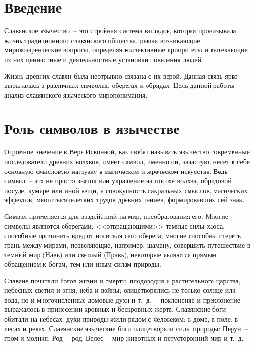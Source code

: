 \documentclass[pscyr,titlepage,chapters]{hedreport}
\begin{document}
  \maketitle
  \onehalfspacing
  \tableofcontents

  \chapter*{Введение}

  Славянское язычество~-- это стройная система взглядов, которая пронизывала
  жизнь традиционного славянского общества, решая возникающие мировоззренческие
  вопросы, определяя коллективные приоритеты и вытекающие из них ценностные и
  деятельностные установки поведения людей.

  Жизнь древних славян была неотрывно связана с их верой. Данная связь ярко
  выражалась в различных символах, оберегах и обрядах.  Цель данной работы~--
  анализ славянского языческого миропонимания.

  \chapter{Роль символов в язычестве}

  Огромное значение в Вере Исконной, как любят называть язычество современные
  последователи древних волхвов, имеет символ, именно он, зачастую, несет в себе
  основную смысловую нагрузку в магическом и жреческом искусстве. Ведь символ~--
  это не просто значок или украшение на посохе волхва, обрядовой посуде, кумире
  или иной вещи, а совокупность сакральных смыслов, магических эффектов,
  многотысячелетних трудов древних гениев, формировавших сей знак.

  Символ применяется для воздействий на мир, преобразования его. Многие символы
  являются оберегами, <<отвращающими>> темные силы хаоса, способные причинить
  вред от носителя сего оберега, многие способны стереть грань между мирами,
  позволяющие, например, шаману, совершить путешествие в темный мир (Навь) или
  светлый (Правь), некоторые являются прямым обращением к богам, тем или иным
  силам природы.

  Славяне почитали богов жизни и смерти, плодородия и растительного царства,
  небесных светил и огня, неба и войны; олицетворялись не только солнце или
  вода, но и многочисленные домовые духи и т.~д.~-- поклонение и преклонение
  выражалось в принесении кровных и бескровных жертв. Славянские боги обитали
  на небесах; духи природы жили рядом с человеком: в доме, в поле, в лесах и
  реках. Славянские языческие боги олицетворяли силы природы: Перун~-- гром и
  молния, Род~-- род, Велес~-- мир животных и потусторонний мир и т.~д.
\end{document}
